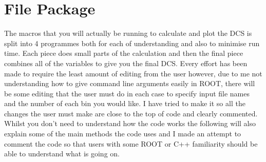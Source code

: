 \documentclass[12pt]{article}
\numberwithin{equation}{section}
\numberwithin{figure}{section}
\begin{document}
\section{File Package} %
\label{sec:code_package}
The macros that you will actually be running to calculate and plot the DCS is split into 4 programmes both for each of understanding and also to minimise run time. Each piece does small parts of the calculation and then the final piece combines all of the variables to give you the final DCS. Every effort has been made to require the least amount of editing from the user however, due to me not understanding how to give command line arguments easily in ROOT, there will be some editing that the user must do in each case to specify input file names and the number of each bin you would like. I have tried to make it so all the changes the user must make are close to the top of code and clearly commented. Whilst you don't need to understand how the code works the following will also explain some of the main methods the code uses and I made an attempt to comment the code so that users with some ROOT or C++ familiarity should be able to understand what is going on.
%
\end{document}
